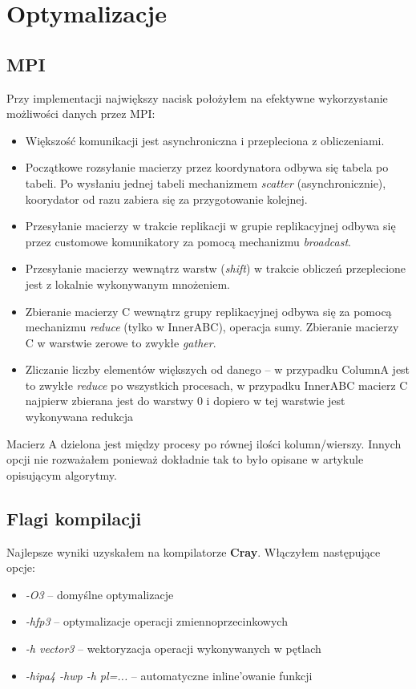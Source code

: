 \documentclass{article}
\begin{document}
\section{Optymalizacje}
\subsection{MPI}
Przy implementacji największy nacisk położyłem na efektywne wykorzystanie możliwości danych przez MPI:
\begin{itemize}
\item Większość komunikacji jest asynchroniczna i przepleciona z obliczeniami. 
\item Początkowe rozsyłanie macierzy przez koordynatora odbywa się tabela po tabeli. 
         Po wysłaniu jednej tabeli mechanizmem \emph{scatter} (asynchronicznie), 
         koorydator od razu zabiera się za przygotowanie kolejnej.
\item Przesyłanie macierzy w trakcie replikacji w grupie replikacyjnej 
         odbywa się przez customowe komunikatory za pomocą mechanizmu \emph{broadcast}.
\item Przesyłanie macierzy wewnątrz warstw (\emph{shift}) w trakcie obliczeń przeplecione jest z lokalnie wykonywanym mnożeniem.
\item Zbieranie macierzy C wewnątrz grupy replikacyjnej odbywa się za pomocą mechanizmu \emph{reduce} (tylko w InnerABC),
         operacja sumy. Zbieranie macierzy C w warstwie zerowe to zwykłe \emph{gather}.
\item Zliczanie liczby elementów większych od danego -- w przypadku ColumnA jest to zwykłe \emph{reduce} po wszystkich procesach,
         w przypadku InnerABC macierz C najpierw zbierana jest do warstwy 0 i dopiero w tej warstwie jest wykonywana redukcja
\end{itemize}

Macierz A dzielona jest między procesy po równej ilości kolumn/wierszy. Innych opcji nie rozważałem ponieważ dokładnie tak
to było opisane w artykule opisującym algorytmy.

\subsection{Flagi kompilacji}
Najlepsze wyniki uzyskałem na kompilatorze \textbf{Cray}. Włączyłem następujące opcje:
\begin{itemize}
  \item \emph{-O3} -- domyślne optymalizacje
  \item \emph{-hfp3} -- optymalizacje operacji zmiennoprzecinkowych
  \item \emph{-h vector3} -- wektoryzacja operacji wykonywanych w pętlach
  \item \emph{-hipa4 -hwp -h pl=...} -- automatyczne inline'owanie funkcji
\end{itemize}
\end{document}
